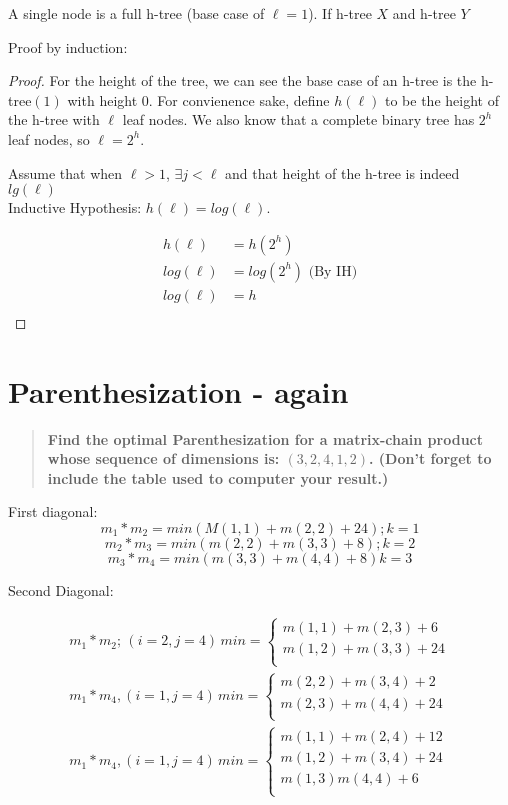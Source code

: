 \documentclass[titlepage]{article}\usepackage[]{graphicx}\usepackage[]{color}
\begin{document}
A single node is a full h-tree (base case of $\ell = 1 $). If h-tree $X$ and
h-tree $Y$ 


Proof by induction:
\begin{proof}
For the height of the tree, we can see the base case of an h-tree is the
h-tree$(1)$ with height 0. For convienence sake, define $h(\ell)$ to be
the height of the h-tree with $\ell$ leaf nodes. We also know that a complete
binary tree has $2^h$ leaf nodes, so $\ell = 2^h$. 

Assume that when $\ell > 1$,  $ \exists j < \ell $ and that height of the h-tree is
indeed $lg(\ell)$\\
Inductive Hypothesis: $h(\ell) = log(\ell)$.

\begin{align*}
  h(\ell) &= h(2^h) \\
  log(\ell) &= log(2^h) \text{ (By IH)} \\ 
  log(\ell) &= h \\
\end{align*}
\end{proof}


\section{Parenthesization - again }
\begin{quote}
 \textbf{ Find the optimal Parenthesization for a matrix-chain product whose sequence
  of dimensions is: $(3,2,4,1,2)$. (Don't forget to include the table used to
computer your result.)}
\end{quote}

First diagonal:
\[ m_1 * m_2 = min \left( M(1,1) + m(2,2) + 24\right); k=1 \]
\[ m_2 * m_3 = min \left( m(2,2) + m(3,3) + 8 \right); k=2 \]
\[ m_3 * m_4 = min \left( m(3,3) + m(4,4) + 8 \right) k =3 \]


Second Diagonal:

\begin{align*}
	m_1 * m_2;\, (i = 2, j=4)\, min =  \begin{cases} 
				m(1,1) + m(2,3) + 6 \\
				m(1,2) + m(3,3) + 24 \\ 
			\end{cases} \\
	m_1 * m_4 , (i=1, j=4)\, min = \begin{cases}
				m(2,2) + m(3,4) + 2 \\
				m(2,3) + m(4,4) + 24 \\
			\end{cases} \\
	m_1 * m_4, (i =1, j=4 )\, min = \begin{cases}
				m(1,1) + m(2,4) + 12 \\
				m(1,2) + m(3,4) + 24 \\
				m(1,3) m(4,4) + 6  \\
			\end{cases} \\
\end{align*}
\end{document}

